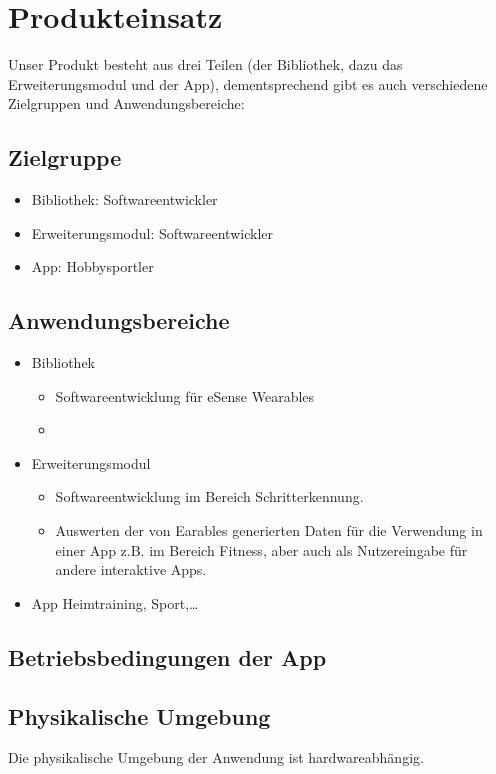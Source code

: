 \documentclass[a4paper,12pt]{article}
\begin{document}
\section{Produkteinsatz}
Unser Produkt besteht aus drei Teilen (der Bibliothek, dazu das Erweiterungsmodul und der App), dementsprechend gibt es auch verschiedene Zielgruppen und Anwendungsbereiche:
  \subsection{Zielgruppe}
  \begin{itemize}
    \item\textsf{Bibliothek:} Softwareentwickler
    \item\textsf{Erweiterungsmodul:} Softwareentwickler
    \item\textsf{App:} Hobbysportler
  \end{itemize}
  \subsection{Anwendungsbereiche}
    \begin{itemize}
      \item\textsf{Bibliothek} \begin{itemize}
        \item[] Softwareentwicklung für eSense Wearables 
        \item[] %
      \end{itemize}
      \item\textsf{Erweiterungsmodul}
      \begin{itemize}
        \item[] Softwareentwicklung im Bereich Schritterkennung.
        \item[] Auswerten der von \Gls{Earables} generierten Daten für die Verwendung in einer App z.B. im Bereich Fitness, aber auch als Nutzereingabe für andere interaktive Apps.
      \end{itemize}
      \item\textsf{App} Heimtraining, Sport,\dots
    \end{itemize}
  \subsection{Betriebsbedingungen der App} %
    \subsection{Physikalische Umgebung}
      Die physikalische Umgebung der Anwendung ist hardwareabhängig.
\end{document}

